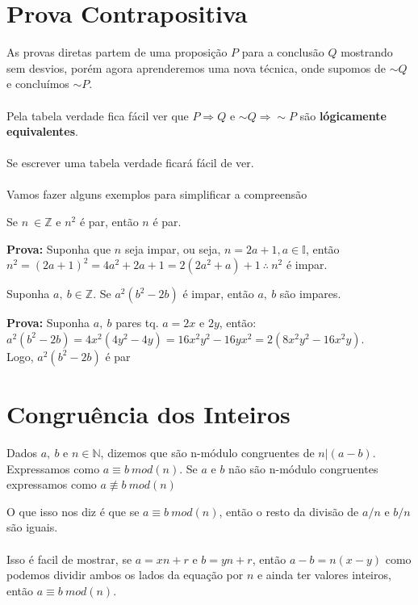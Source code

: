 \documentclass[main.tex]{subfiles}
\begin{document}
\section{Prova Contrapositiva}
As provas diretas partem de uma proposição $P$ para a conclusão $Q$ mostrando sem desvios, porém agora aprenderemos uma nova técnica, onde supomos de $\sim Q$ e concluímos $\sim P$.
\\~\\
Pela tabela verdade fica fácil ver que $P \Rightarrow Q$ e $ \sim Q \Rightarrow \sim P$ são \textbf{lógicamente equivalentes}.
\\~\\
Se escrever uma tabela verdade ficará fácil de ver.
\\~\\
Vamos fazer alguns exemplos para simplificar a compreensão
\begin{proposition}
Se $n \ \in  \mathbb{Z}$ e $n^2$ é par, então $n$ é par.
\end{proposition}
\textbf{Prova:} Suponha que $n$ seja impar, ou seja, $n = 2a+1, a \in \mathbb{I}$, então \\ $n^2 = (2a +1)^2 = 4a^2 +2a + 1 = 2(2a^2 + a) + 1 \ \therefore \ n^2$ é impar.
\begin{proposition}
Suponha $a, \ b \in \mathbb{Z}$. Se $a^2(b^2 -2b)$ é impar, então $a, \ b$ são impares.
\end{proposition}
\textbf{Prova:} Suponha $a, \ b$ pares tq. $a = 2x$ e $2y$, então:\\
$a^2(b^2 -2b) = 4x^2(4y^2 - 4y) = 16x^2y^2 -16yx^2 = 2(8x^2y^2 -16x^2y)$.\\
Logo, $a^2(b^2 -2b)$ é par

\section{Congruência dos Inteiros}
\begin{definition}
Dados $a, \ b $ e $n \in \mathbb{N}$, dizemos que são n-módulo congruentes de $n | (a-b)$. Expressamos como $ a \equiv b \ mod(n)$. Se $a$ e $b$ não são n-módulo congruentes expressamos como $a \not\equiv  b \ mod(n)$
\end{definition}
O que isso nos diz é que se $a \equiv b \ mod(n)$, então o resto da divisão de $a/n$ e $b/n$ são iguais. \\~\\
Isso é facil de mostrar, se $a = xn + r$ e $b = yn + r$, então $a-b = n(x-y)$ como podemos dividir ambos os lados da equação por $n$ e ainda ter valores inteiros, então $a \equiv b \ mod(n)$.
\end{document}
